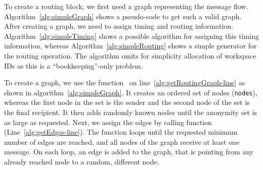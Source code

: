 To create a routing block, we first need a graph representing the message flow. Algorithm~\ref{alg:simpleGraph} shows a pseudo-code to get such a valid graph. After creating a graph, we need to assign timing and routing information. Algorithm~\ref{alg:simpleTiming} shows a possible algorithm for assigning this timing information, whereas Algorithm~\ref{alg:simpleRouting} shows a simple generator for the routing operation. The algorithm omits for simplicity allocation of workspace IDs as this is a ``bookkeeping''-only problem.

To create a graph, we use the function~ on line~\ref{alg:getRoutingGraph-line} as shown in algorithm~\ref{alg:simpleGraph}. It creates an ordered set of nodes (\texttt{nodes}), whereas the first node in the set is the sender and the second node of the set is the final recipient. It then adds randomly known nodes until the anonymity set is as large as requested. Next, we assign the edges by calling function~ (Line~\ref{alg:getEdges-line}). The function loops until the requested minimum number of edges are reached, and all nodes of the graph receive at least one message. On each loop, an edge is added to the graph, that is pointing from any already reached node to a random, different node.

